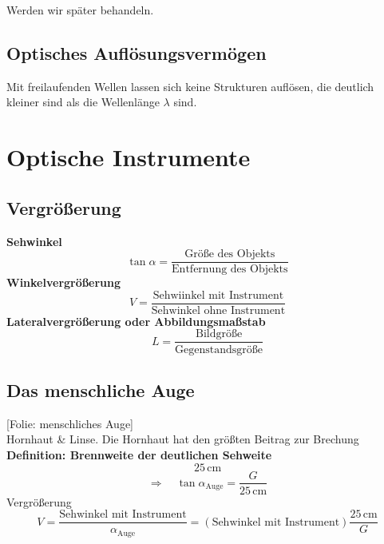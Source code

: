\documentclass[titlepage,11pt,a4paper,ngerman]{report}
\newcommand{\tx}[1]{\textrm{#1}}
\newcommand{\folie}[1]{\color{gray}[Folie: #1]\color{black}}
\newcommand{\lcom}[1]{\color{MidnightBlue}#1\color{black}}
\newcommand{\rbox}[1]{\begin{tcolorbox}[colback=white,colframe=red!75!black]#1\end{tcolorbox}}
\begin{document}
\lcom{Werden wir später behandeln.}

\subsection{Optisches Auflösungsvermögen}

\rbox{Mit freilaufenden Wellen lassen sich keine Strukturen auflösen, die deutlich kleiner sind als die Wellenlänge $ \lambda $ sind.}

\section{Optische Instrumente}

\subsection{Vergrößerung}

\textbf{Sehwinkel}
\begin{equation*}
\tan\alpha = \frac{\tx{Größe des Objekts}}{\tx{Entfernung des Objekts}}
\end{equation*}
\textbf{Winkelvergrößerung}
\begin{equation*}
V = \frac{\tx{Sehwiinkel mit Instrument}}{\tx{Sehwinkel ohne Instrument}}
\end{equation*}
\textbf{Lateralvergrößerung oder Abbildungsmaßstab}
\begin{equation*}
L = \frac{\tx{Bildgröße}}{\tx{Gegenstandsgröße}}
\end{equation*}

\subsection{Das menschliche Auge}

\folie{menschliches Auge}\\
Hornhaut \& Linse. Die Hornhaut hat den größten Beitrag zur Brechung\\[5pt]
\textbf{Definition: Brennweite der deutlichen Sehweite}
\begin{equation*}
25 \, \tx{cm}
\end{equation*}
\begin{equation*}
\Rightarrow \quad \tan \alpha_{\tx{Auge}} = \frac{G}{25 \, \tx{cm}}
\end{equation*}
Vergrößerung
\begin{equation*}
V = \frac{\tx{Sehwinkel mit Instrument}}{\alpha_{\tx{Auge}}} = (\tx{Sehwinkel mit Instrument}) \frac{25 \, \tx{cm}}{G}
\end{equation*}
\end{document}
